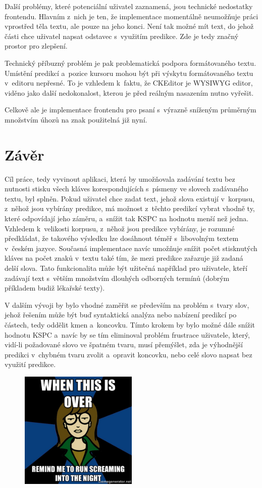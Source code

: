 \documentclass[a4paper,11pt,openany]{book} %
\begin{document}
Další problémy, které potenciální uživatel zaznamená, jsou technické nedostatky frontendu. Hlavním z~nich je ten, že implementace momentálně neumožňuje práci vprostřed těla textu, ale pouze na jeho konci. Není tak možné mít text, do jehož části chce uživatel napsat odstavec s~využitím predikce. Zde je tedy značný prostor pro zlepšení.

Technický příbuzný problém je pak problematická podpora formátovaného textu. Umístění predikcí a~pozice kursoru mohou být při výskytu formátovaného textu v~editoru nepřesné. To je vzhledem k~faktu, že CKEditor je WYSIWYG editor, viděno jako další nedokonalost, kterou je před reálným nasazením nutno vyřešit.

Celkově ale je implementace frontendu pro psaní s~výrazně sníženým průměrným množstvím úhozů na znak použitelná již nyní.

\clearpage

\chapter*{Závěr}

Cíl práce, tedy vyvinout aplikaci, která by umožňovala zadávání textu bez nutnosti stisku všech kláves korespondujících s~písmeny ve slovech zadávaného textu, byl splněn. Pokud uživatel chce zadat text, jehož slova existují v~korpusu, z~něhož jsou vybírány predikce, má možnost z~těchto predikcí vybrat vhodně ty, které odpovídají jeho záměru, a~snížit tak KSPC na hodnotu menší než jedna. Vzhledem k~velikosti korpusu, z~něhož jsou predikce vybírány, je rozumné předkládat, že takového výsledku lze dosáhnout téměř s~libovolným textem v~českém jazyce. Současná implementace navíc umožňuje snížit počet stisknutých kláves na počet znaků v~textu také tím, že mezi predikce zařazuje již zadaná delší slova. Tato funkcionalita může být užitečná například pro uživatele, kteří zadávají text s~větším množstvím dlouhých odborných termínů (dobrým příkladem budiž lékařské texty).

V dalším vývoji by bylo vhodné zaměřit se především na problém s~tvary slov, jehož řešením může být buď syntaktická analýza nebo nabízení predikcí po částech, tedy oddělit kmen a~koncovku. Tímto krokem by bylo možné dále snížit hodnotu KSPC a~navíc by se tím eliminoval problém frustrace uživatele, který, vidí-li požadované slovo ve špatném tvaru, musí přemýšlet, zda je výhodnější predikci v~chybném tvaru zvolit a~opravit koncovku, nebo celé slovo napsat bez využití predikce. 

\begin{figure}[h]
	\centering
	\includegraphics[width=0.5\textwidth]{daria}
\end{figure}

\clearpage

\pagestyle{plain}

\printbibliography[title={Seznam literatury}]
\end{document}
